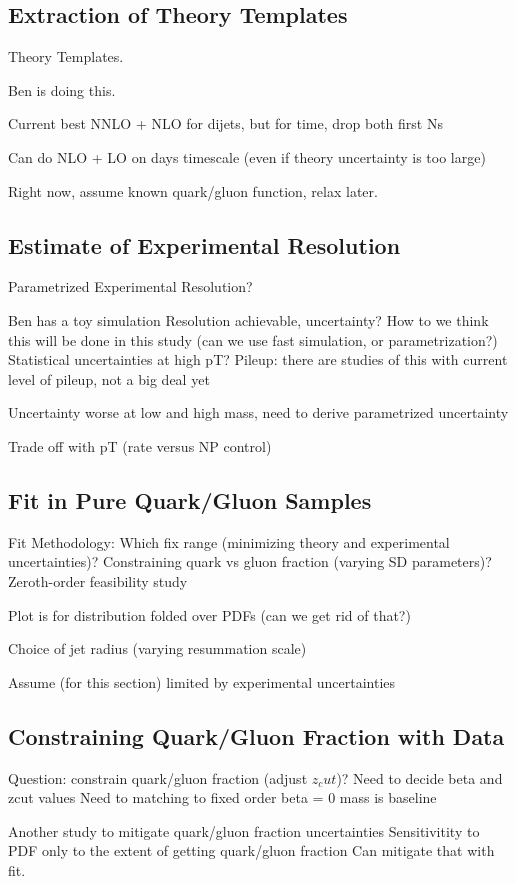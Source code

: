 
\subsection{Extraction of Theory Templates}

	Theory Templates.

	Ben is doing this.

	Current best NNLO + NLO for dijets, but for time, drop both first Ns
 
 Can do NLO + LO on days timescale (even if theory uncertainty is too large)

 Right now, assume known quark/gluon function, relax later.


\subsection{Estimate of Experimental Resolution}

	Parametrized Experimental Resolution?

	Ben has a toy simulation
	Resolution achievable, uncertainty?
	How to we think this will be done in this study (can we use fast simulation, or parametrization?)
	Statistical uncertainties at high pT?
	Pileup:  there are studies of this with current level of pileup, not a big deal yet

	Uncertainty worse at low and high mass, need to derive parametrized uncertainty
	
	Trade off with pT (rate versus NP control)


\subsection{Fit in Pure Quark/Gluon Samples}

Fit Methodology:
	Which fix range (minimizing theory and experimental uncertainties)?
	Constraining quark vs gluon fraction (varying SD parameters)?
	Zeroth-order feasibility study
	
	Plot is for distribution folded over PDFs (can we get rid of that?)

	Choice of jet radius (varying resummation scale)

Assume (for this section) limited by experimental uncertainties



\subsection{Constraining Quark/Gluon Fraction with Data}

	Question:  constrain quark/gluon fraction (adjust $z_cut$)?
	Need to decide beta and zcut values
	Need to matching to fixed order
	beta = 0 mass is baseline
	
	
	Another study to mitigate quark/gluon fraction uncertainties
	Sensitivitity to PDF only to the extent of getting quark/gluon fraction
	Can mitigate that with fit.


